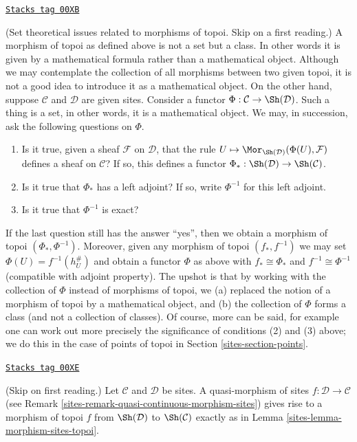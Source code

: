 \begin{remark}
\label{sites-remark-morphism-topoi-big}
\href{https://stacks.math.columbia.edu/tag/00XB}{\texttt{Stacks tag 00XB}}

(Set theoretical issues related to morphisms of topoi. Skip
on a first reading.)
A morphism of topoi as defined above is not a set but a class.
In other words it is given by a mathematical formula rather
than a mathematical object. Although we may contemplate
the collection of all morphisms between two given topoi,
it is not a good idea to introduce it as a mathematical object.
On the other hand, suppose $\mathcal{C}$ and $\mathcal{D}$ are
given sites. Consider a functor
$\Phi : \mathcal{C} \to \Sh(\mathcal{D})$.
Such a thing is a set, in other words, it is a mathematical object.
We may, in succession, ask the following questions on $\Phi$.
\begin{enumerate}
\item Is it true, given a sheaf $\mathcal{F}$ on $\mathcal{D}$,
that the rule
$U \mapsto \Mor_{\Sh(\mathcal{D})}(\Phi(U), \mathcal{F})$
defines a sheaf on $\mathcal{C}$? If so, this defines a functor
$\Phi_* : \Sh(\mathcal{D}) \to \Sh(\mathcal{C})$.
\item Is it true that $\Phi_*$ has a left adjoint? If so,
write $\Phi^{-1}$ for this left adjoint.
\item Is it true that $\Phi^{-1}$ is exact?
\end{enumerate}
If the last question still has the answer ``yes'', then we obtain
a morphism of topoi $(\Phi_*, \Phi^{-1})$. Moreover, given any
morphism of topoi $(f_*, f^{-1})$ we may set
$\Phi(U) = f^{-1}(h_U^\#)$ and obtain a functor $\Phi$ as above
with $f_* \cong \Phi_*$ and $f^{-1} \cong \Phi^{-1}$ (compatible
with adjoint property).
The upshot is that by working with the collection of $\Phi$
instead of morphisms of topoi, we (a) replaced the notion of
a morphism of topoi by a mathematical object, and (b)
the collection of $\Phi$ forms a class (and not a collection
of classes). Of course, more can be said, for example one can work
out more precisely the significance of conditions (2) and (3) above;
we do this in the case of points of topoi in Section \ref{sites-section-points}.
\end{remark}

\begin{remark}
\label{sites-remark-quasi-continuous-morphism-topoi}
\href{https://stacks.math.columbia.edu/tag/00XE}{\texttt{Stacks tag 00XE}}

(Skip on first reading.)
Let $\mathcal{C}$ and $\mathcal{D}$ be sites.
A quasi-morphism of sites $f : \mathcal{D} \to \mathcal{C}$
(see Remark \ref{sites-remark-quasi-continuous-morphism-sites})
gives rise to a morphism of topoi $f$ from
$\Sh(\mathcal{D})$ to $\Sh(\mathcal{C})$
exactly as in Lemma \ref{sites-lemma-morphism-sites-topoi}.
\end{remark}

